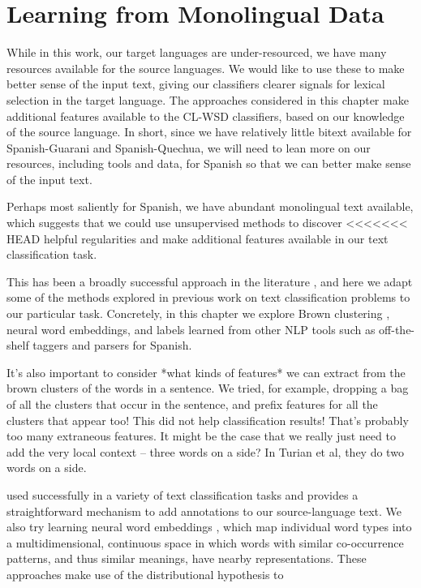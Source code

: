 \chapter{Learning from Monolingual Data}
\label{chap:monolingual}
While in this work, our target languages are under-resourced, we have many
resources available for the source languages. We would like to use these to
make better sense of the input text, giving our classifiers clearer signals for
lexical selection in the target language.
The approaches considered in this chapter make additional features available to
the CL-WSD classifiers, based on our knowledge of the source language.
In short, since we have relatively little bitext available for Spanish-Guarani
and Spanish-Quechua, we will need to lean more on our resources, including
tools and data, for Spanish so that we can better make sense of the input text.

Perhaps most saliently for Spanish, we have abundant monolingual text
available, which suggests that we could use unsupervised methods to discover
<<<<<<< HEAD
helpful regularities and make additional features available in our text
classification task.

This has been a broadly successful
approach in the literature \cite{turian-ratinov-bengio:2010:ACL}
, and here we
adapt some of the methods explored in previous work on text classification
problems to our particular task. Concretely, in this chapter we explore Brown
clustering \cite{brown1992class}, neural word embeddings, and labels learned
from other NLP tools such as off-the-shelf taggers and parsers for Spanish.


It's also important to consider *what kinds of features* we can extract from
the brown clusters of the words in a sentence. We tried, for example, dropping
a bag of all the clusters that occur in the sentence, and prefix features for
all the clusters that appear too! This did not help classification results!
That's probably too many extraneous features.
It might be the case that we really just need to add the very local context --
three words on a side? In Turian et al, they do two words on a side.


used successfully in a variety of text classification tasks
and provides a straightforward mechanism
to add annotations to our source-language text.  We also try learning neural
word embeddings \cite{mikolovword2vec}, which map individual word types into a
multidimensional, continuous space in which words with similar co-occurrence
patterns, and thus similar meanings, have nearby representations.
These approaches make use of the distributional hypothesis to 

